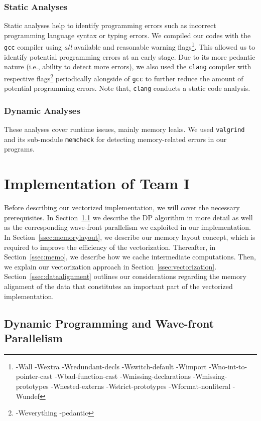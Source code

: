 \documentclass[runningheads,a4paper]{llncs}
\begin{document}
\subsubsection{Static Analyses}
Static analyses help to identify programming errors such as incorrect programming language syntax or typing errors.
We compiled our codes with the \texttt{gcc} compiler using {\em all} available and reasonable warning 
flags\footnote{-Wall -Wextra -Wredundant-decls -Wswitch-default -Wimport -Wno-int-to-pointer-cast -Wbad-function-cast -Wmissing-declarations 
-Wmissing-prototypes -Wnested-externs -Wstrict-prototypes -Wformat-nonliteral -Wundef}. 
This allowed us to identify potential programming errors at an early stage. 
Due to its more pedantic nature (i.e., ability to detect more errors), we also used the \texttt{clang} compiler with respective flags\footnote{-Weverything -pedantic} 
periodically alongside of \texttt{gcc} to further reduce the amount of potential programming errors. Note that, \texttt{clang} conducts a static code analysis.

\subsubsection{Dynamic Analyses}
These analyses cover runtime issues, mainly memory leaks.
We used \texttt{valgrind} and its sub-module \texttt{memcheck} for detecting memory-related errors in our programs. 


\section{Implementation of Team I}
\label{sec:implementation-1}

Before describing our vectorized implementation, we will cover the necessary prerequisites.
In Section~\ref{ssec:dynprogramming} we describe the DP algorithm in more detail as well as the corresponding wave-front parallelism we exploited in our implementation. 
In Section~\ref{ssec:memorylayout}, we describe our memory layout concept, which is required to improve the efficiency of the vectorization. 
Thereafter, in Section~\ref{ssec:memo}, we describe how we cache intermediate computations. Then, we explain our vectorization approach in Section~\ref{ssec:vectorization}. 
Section~\ref{ssec:dataalignment} outlines our considerations regarding the memory alignment of the data that constitutes an important part of the vectorized implementation. 

\subsection{Dynamic Programming and Wave-front Parallelism}
\label{ssec:dynprogramming}
\end{document}
